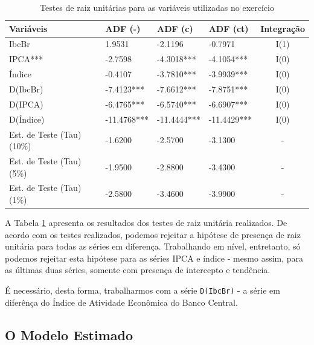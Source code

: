 \begin{table}[!h]
\centering
\caption{Testes de raiz unitárias para as variáveis utilizadas no exercício}
\begin{tabular}{llllc}
  \hline
Variáveis & ADF (-) & ADF (c) & ADF (ct) & Integração \\ 
  \hline
IbcBr & 1.9531 & -2.1196 & -0.7971 & I(1)\\ 
IPCA*** & -2.7598 & -4.3018*** & -4.1054*** & I(0) \\ 
Índice & -0.4107 & -3.7810*** & -3.9939*** & I(0)\\ 
D(IbcBr) & -7.4123*** & -7.6612*** & -7.8751*** & I(0)\\ 
D(IPCA) & -6.4765*** & -6.5740*** & -6.6907*** & I(0)\\ 
D(Índice) & -11.4768*** & -11.4444*** & -11.4429*** & I(0)\\ 
Est. de Teste (Tau) (10\%) & -1.6200 & -2.5700 & -3.1300 & -\\ 
Est. de Teste (Tau) (5\%) & -1.9500 & -2.8800 & -3.4300 & -\\ 
Est. de Teste (Tau) (1\%) & -2.5800 & -3.4600 & -3.9900 & -\\ 
   \hline
\end{tabular} \label{adf}
\end{table}

A Tabela \ref{adf} apresenta os resultados dos testes de raiz unitária realizados. De acordo com os testes realizados, podemos rejeitar a hipótese de presença de raiz unitária para todas as séries em diferença. Trabalhando em nível, entretanto, só podemos rejeitar esta hipótese para as séries IPCA e índice - mesmo assim, para as últimas duas séries, somente com presença de intercepto e tendência.

É necessário, desta forma, trabalharmos com a série \texttt{D(IbcBr)} - a série em diferênça do Índice de Atividade Econômica do Banco Central.

\subsection{O Modelo Estimado}

